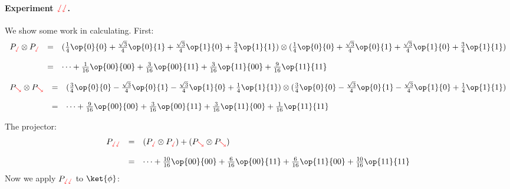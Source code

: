 \documentclass{article}
\newcommand{\zplus}{{\color{red}\sswarrow}}
\newcommand{\zminus}{{\color{red}\searrow}}
\theoremstyle{remark}
\begin{document}
\newpage
\paragraph*{Experiment $\zplus\zplus$.}
We show some work in calculating. First:
\[
    \begin{array}{rcl}
    P_{\zplus}\otimes P_{\zplus}
        &=& (\frac{1}{4} \op{0}{0} 
         + \frac{\sqrt{3}}{4} \op{0}{1} + \frac{\sqrt{3}}{4} 
             \op{1}{0} + \frac{3}{4} \op{1}{1}) \otimes (\frac{1}{4} \op{0}{0} 
        + \frac{\sqrt{3}}{4} \op{0}{1} + \frac{\sqrt{3}}{4} \op{1}{0} 
        + \frac{3}{4} \op{1}{1})
        \\ \\
        &=& \dots + \frac{1}{16}\op{00}{00}
          + \frac{3}{16}\op{00}{11}
          + \frac{3}{16}\op{11}{00}
          + \frac{9}{16}\op{11}{11}
    \end{array}
\]

\[
    \begin{array}{rcl}
    P_{\zminus}\otimes P_{\zminus}
        &=& (\frac{3}{4} \op{0}{0} 
            - \frac{\sqrt{3}}{4} \op{0}{1} 
            - \frac{\sqrt{3}}{4} \op{1}{0} 
            + \frac{1}{4} \op{1}{1})
            \otimes 
          (\frac{3}{4} \op{0}{0} 
            - \frac{\sqrt{3}}{4} \op{0}{1} 
            - \frac{\sqrt{3}}{4} \op{1}{0} 
            + \frac{1}{4} \op{1}{1})
            \\ \\
        &=& \dots 
        + \frac{9}{16} \op{00}{00}
        + \frac{3}{16} \op{00}{11} 
        + \frac{3}{16} \op{11}{00} 
        + \frac{1}{16} \op{11}{11} 
    \end{array}
\]

The projector:
\[
    \begin{array}{rcl}
P_{\zplus\zplus} 
    &=& (P_{\zplus}\otimes P_{\zplus}) + (P_{\zminus} \otimes P_{\zminus})\\ \\
    &=& \dots 
        + \frac{10}{16} \op{00}{00}
        + \frac{6}{16} \op{00}{11} 
        + \frac{6}{16} \op{11}{00} 
        + \frac{10}{16} \op{11}{11} 
\end{array}\]
Now we apply $P_{\zplus\zplus}$ to $\ket{\phi}$:
\end{document}
